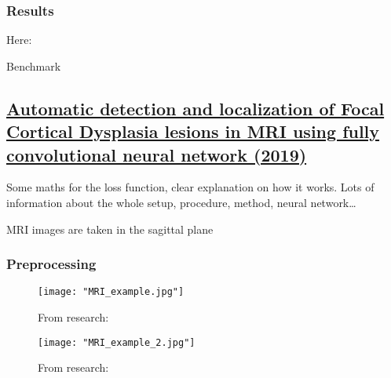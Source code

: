 \subsubsection{Results}

Here: 

\begin{table}[htbp]
	\centering
	\caption{Benchmark}

	\caption{Results from }%
	\label{tab:res3}
\end{table}

\subsection{\href{https://www.sciencedirect.com/science/article/pii/S1746809419301211\#sec0010}{Automatic detection and localization of Focal Cortical Dysplasia lesions in MRI using fully convolutional neural network (2019)}}
\label{sub:sec:res4}

Some maths for the loss function, clear explanation on how it works.
Lots of information about the whole setup, procedure, method, neural network\dots

MRI images are taken in the sagittal plane

\subsubsection{Preprocessing}

\begin{figure}[htbp]
	\centering
	\texttt{[image: "MRI\_example.jpg"]}
	\caption{From research: }
	\label{fig:res4:1}
\end{figure}

\begin{figure}[htbp]
	\centering
	\texttt{[image: "MRI\_example\_2.jpg"]}
	\caption{From research: }
	\label{fig:res4:2}
\end{figure}

